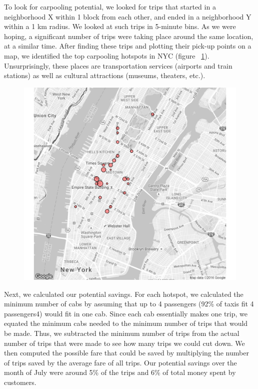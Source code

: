 \documentclass[twocolumn]{article}
\begin{document}
To look for carpooling potential, we looked for trips that started in a neighborhood X within 1 block from each other, and ended in a neighborhood Y within a 1 km radius. We looked at such trips in 5-minute bins. As we were hoping, a significant number of trips were taking place around the same location, at a similar time. After finding these trips and plotting their pick-up points on a map, we identified the top carpooling hotspots in NYC (figure ~\ref{fig:hotspots}). Unsurprisingly, these places are transportation services (airports and train stations) as well as cultural attractions (museums, theaters, etc.). 
\begin{figure}[h]
  \centering
  \includegraphics[width=.9\linewidth]{top_25_hotspots}
  \label{fig:hotspots}
\end{figure}
Next, we calculated our potential savings. For each hotspot, we calculated the minimum number of cabs by assuming that up to 4 passengers (92\% of taxis fit 4 passengers4) would fit in one cab. Since each cab essentially makes one trip, we equated the minimum cabs needed to the minimum number of trips that would be made. Thus, we subtracted the minimum number of trips from the actual number of trips that were made to see how many trips we could cut down. We then computed the possible fare that could be saved by multiplying the number of trips saved by the average fare of all trips. Our potential savings over the month of July were around 5\% of the trips and 6\% of total money spent by customers.
\end{document}

